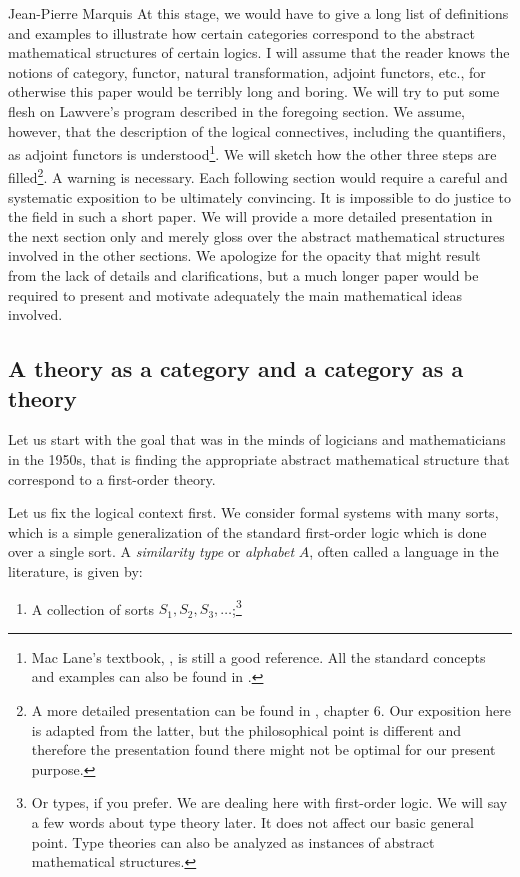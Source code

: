 \begin{artengenv}{Jean-Pierre Marquis}
At this stage, we would have to give a long list of definitions and examples to illustrate how certain categories correspond to the abstract mathematical structures of certain logics. I will assume that the reader knows the notions of category, functor, natural transformation, adjoint functors, etc., for otherwise this paper would be terribly long and boring. We will try to put some flesh on Lawvere's program described in the foregoing section. We assume, however, that the description of the logical connectives, including the quantifiers, as adjoint functors is understood\footnote{Mac Lane's textbook, \parencite*{MacLane1998}, is still a good reference. All the standard concepts and examples can also be found in \parencite{Riehl2017}.}. We will sketch how the other three steps are filled\footnote{A more detailed presentation can be found in \parencite{Marquis2009}, chapter 6. Our exposition here is adapted from the latter, but the philosophical point is different and therefore the presentation found there might not be optimal for our present purpose.}. A warning is necessary. Each following section would require a careful and systematic exposition to be ultimately convincing. It is impossible to do justice to the field in such a short paper. We will provide a more detailed presentation in the next section only and merely gloss over the abstract mathematical structures involved in the other sections. We apologize for the opacity that might result from the lack of details and clarifications, but a much longer paper would be required to present and motivate adequately the main mathematical ideas involved. 

\subsection{A theory as a category and a category as a theory}

Let us start with the goal that was in the minds of logicians and mathematicians in the 1950s, that is finding the appropriate abstract mathematical structure that correspond to a first-order theory. 

Let us fix the logical context first. We consider formal systems with many sorts, which is a simple generalization of the standard first-order logic which is done over a single sort. A \textit{similarity type} or \textit{alphabet} \( A \), often called a language in the literature, is given by:
%
\begin{enumerate}

\item A collection of sorts \( S_1, S_2, S_3, \dots \);\footnote{Or types, if you prefer. We are dealing here with first-order logic. We will say a few words about type theory later. It does not affect our basic general point. Type theories can also be analyzed as instances of abstract mathematical structures.}


\end{enumerate}
\end{artengenv}
